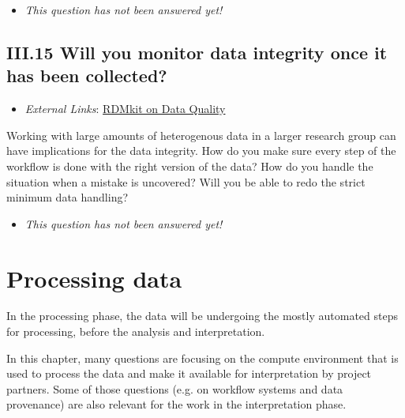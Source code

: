 \documentclass[a4paper,12pt]{report}
\begin{document}
\begin{itemize}
  \item[\XSolidBrush] \textit{This question has not been answered yet!}
\end{itemize}
  


\section*{\protect\textcolor{colorSecId}{III.15} Will you monitor data integrity once it has been collected?}

\label{b1df3c74-0b1f-4574-81c4-4cc2d780c1af.02b3fed1-0b50-4a80-b8b6-a225a1107022}


\begin{itemize}
  \item \textit{External Links}: \href{https://rdmkit.elixir-europe.org/data_quality.html}{RDMkit on Data Quality}\end{itemize}


\noindent
\begin{markdown}
Working with large amounts of heterogenous data in a larger research group can have implications for the data integrity. How do you make sure every step of the workflow is done with the right version of the data? How do you handle the situation when a mistake is uncovered? Will you be able to redo the strict minimum data handling?
\end{markdown}



\begin{itemize}
  \item[\XSolidBrush] \textit{This question has not been answered yet!}
\end{itemize}
  




\chapter{Processing data}
\label{10a10ffd-bfe1-4c6b-bbb6-3dfb1e63a5d5}
\begin{markdown}
In the processing phase, the data will be undergoing the mostly automated steps for processing, before the analysis and interpretation.

In this chapter, many questions are focusing on the compute environment that is used to process the data and make it available for interpretation by project partners. Some of those questions (e.g. on workflow systems and data provenance) are also relevant for the work in the interpretation phase.
\end{markdown}
\end{document}
